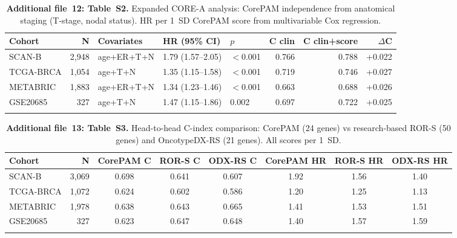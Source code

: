\documentclass[referee,lineno,pdflatex,sn-vancouver-num]{sn-jnl}
\begin{document}
\begin{table}[h]
\caption{\textbf{Additional file~12: Table~S2.} Expanded CORE-A analysis: CorePAM independence from anatomical staging (T-stage, nodal status). HR per 1~SD CorePAM score from multivariable Cox regression.}\label{tab:s2-expanded}
\begin{tabular}{@{}lrlllrrr@{}}
\toprule
Cohort & N & Covariates & HR (95\% CI) & $p$ & C clin & C clin+score & $\Delta$C \\
\midrule
SCAN-B & 2,948 & age+ER+T+N & 1.79 (1.57--2.05) & $<$0.001 & 0.766 & 0.788 & +0.022 \\
TCGA-BRCA & 1,054 & age+T+N & 1.35 (1.15--1.58) & $<$0.001 & 0.719 & 0.746 & +0.027 \\
METABRIC & 1,883 & age+ER+T+N & 1.34 (1.23--1.46) & $<$0.001 & 0.663 & 0.688 & +0.026 \\
GSE20685 & 327 & age+T+N & 1.47 (1.15--1.86) & 0.002 & 0.697 & 0.722 & +0.025 \\
\botrule
\end{tabular}
\end{table}

\begin{table}[h]
\caption{\textbf{Additional file~13: Table~S3.} Head-to-head C-index comparison: CorePAM (24 genes) vs research-based ROR-S (50 genes) and OncotypeDX-RS (21 genes). All scores per 1~SD.}\label{tab:s3-genefu}
\begin{tabular}{@{}lrcccccc@{}}
\toprule
Cohort & N & CorePAM C & ROR-S C & ODX-RS C & CorePAM HR & ROR-S HR & ODX-RS HR \\
\midrule
SCAN-B & 3,069 & 0.698 & 0.641 & 0.607 & 1.92 & 1.56 & 1.40 \\
TCGA-BRCA & 1,072 & 0.624 & 0.602 & 0.586 & 1.20 & 1.25 & 1.13 \\
METABRIC & 1,978 & 0.638 & 0.643 & 0.665 & 1.41 & 1.53 & 1.51 \\
GSE20685 & 327 & 0.623 & 0.647 & 0.648 & 1.40 & 1.57 & 1.59 \\
\botrule
\end{tabular}
\end{table}


\end{document}
